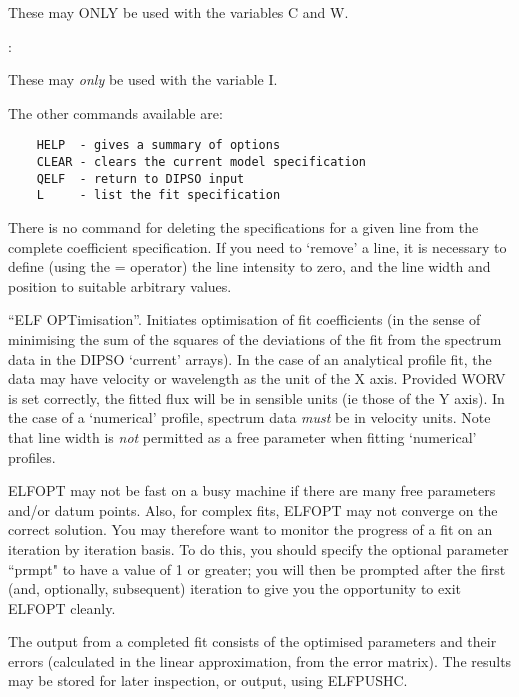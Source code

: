 \begin {description}
\begin{description}
These may ONLY be used with the variables C and W.

\item [The * and / operators]:

These may {\em only} be used with the variable I.

\end{description}

The other commands available are:

\begin{verbatim}
    HELP  - gives a summary of options
    CLEAR - clears the current model specification
    QELF  - return to DIPSO input
    L     - list the fit specification
\end{verbatim}

There is no command for deleting the specifications for a given line
from the complete coefficient specification. If you need to `remove' a
line, it is necessary to define (using the = operator) the line
intensity to zero, and the line width and position to suitable
arbitrary values.

\item [ELFOPT] [prmpt]

``ELF OPTimisation''. Initiates optimisation of fit coefficients (in
the sense of minimising the sum of the squares of the deviations of
the fit from the spectrum data in the DIPSO `current' arrays). In the
case of an analytical profile fit, the data may have velocity or
wavelength as the unit of the X axis. Provided WORV is set correctly,
the fitted flux will be in sensible units (ie those of the Y axis). In
the case of a `numerical' profile, spectrum data {\em must} be in
velocity units. Note that line width is {\em not} permitted as a free
parameter when fitting `numerical' profiles.

ELFOPT may not be fast on a busy machine if there are many free
parameters and/or datum points. Also, for complex fits, ELFOPT may not
converge on the correct solution. You may therefore want to monitor
the progress of a fit on an iteration by iteration basis. To do this,
you should specify the optional parameter ``prmpt" to have a value of
1 or greater; you will then be prompted after the first (and,
optionally, subsequent) iteration to give you the opportunity to exit
ELFOPT cleanly.

The output from a completed fit consists of the optimised parameters
and their errors (calculated in the linear approximation, from the
error matrix). The results may be stored for later inspection, or
output, using ELFPUSHC.


\end{description}
